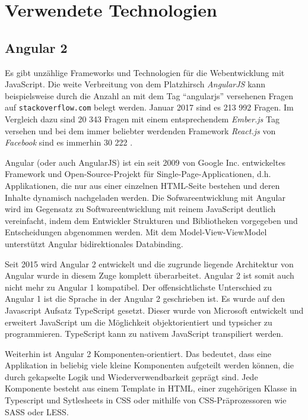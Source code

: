\chapter{Verwendete Technologien}
\label{Verwendete Technologien}

\section{Angular 2}
Es gibt unzählige Frameworks und Technologien für die Webentwicklung mit Java\-Script. Die weite Verbreitung von dem Platzhirsch \emph{AngularJS} kann beispielsweise durch die Anzahl an mit dem Tag "`angularjs"' versehenen Fragen auf \texttt{stackoverflow.com} belegt werden. Januar 2017 sind es 213 992 Fragen. Im Vergleich dazu sind 20 343 Fragen mit einem entsprechendem \emph{Ember.js} Tag versehen und bei dem immer beliebter werdenden Framework \emph{React.js} von \emph{Facebook} sind es immerhin 30 222 \cite{stackoverflow}.

Angular (oder auch AngularJS) ist ein seit 2009 von Google Inc. entwickeltes Framework und Open-Source-Projekt für Single-Page-Applicationen, d.h. Applikationen, die nur aus einer einzelnen HTML-Seite bestehen und deren Inhalte dynamisch nachgeladen werden. Die Sofwareentwicklung mit Angular wird im Gegensatz zu Softwareentwicklung mit reinem JavaScript deutlich vereinfacht, indem dem Entwickler Strukturen und Bibliotheken vorgegeben und Entscheidungen abgenommen werden. Mit dem Model-View-ViewModel unterstützt Angular bidirektionales Databinding.

Seit 2015 wird Angular 2 entwickelt und die zugrunde liegende Architektur von Angular wurde in diesem Zuge komplett überarbeitet. Angular 2 ist somit auch nicht mehr zu Angular 1 kompatibel. Der offensichtlichste Unterschied zu Angular 1 ist die Sprache in der Angular 2 geschrieben ist. Es wurde auf den Javascript Aufsatz TypeScript gesetzt. Dieser wurde von Microsoft entwickelt und erweitert JavaScript um die Möglichkeit objektorientiert und typsicher zu programmieren. TypeScript kann zu nativem JavaScript transpiliert werden.

Weiterhin ist Angular 2 Komponenten-orientiert. Das bedeutet, dass eine Applikation in beliebig viele kleine Komponenten aufgeteilt werden können, die durch gekapselte Logik und Wiederverwendbarkeit geprägt sind. Jede Komponente besteht aus einem Template in HTML, einer zugehörigen Klasse in Typescript und Sytlesheets in CSS oder mithilfe von CSS-Präprozessoren wie SASS oder LESS.

